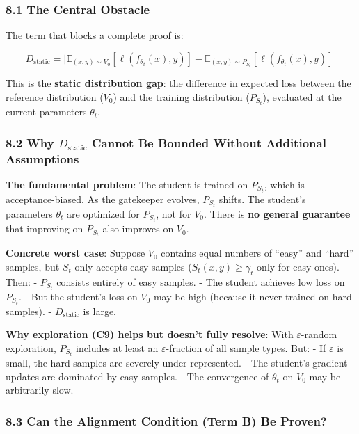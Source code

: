 \documentclass[
  12pt,
]{article}
\begin{document}
\subsubsection{8.1 The Central Obstacle}\label{the-central-obstacle}

The term that blocks a complete proof is:

\[\boxed{\;D_{\text{static}} = \bigl|\mathbb{E}_{(x,y) \sim V_0}[\ell(f_{\theta_t}(x), y)] - \mathbb{E}_{(x,y) \sim P_{S_t}}[\ell(f_{\theta_t}(x), y)]\bigr|\;}\]

This is the \textbf{static distribution gap}: the difference in expected
loss between the reference distribution (\(V_0\)) and the training
distribution (\(P_{S_t}\)), evaluated at the current parameters
\(\theta_t\).

\subsubsection{\texorpdfstring{8.2 Why \(D_{\text{static}}\) Cannot Be
Bounded Without Additional
Assumptions}{8.2 Why D\_\{\textbackslash text\{static\}\} Cannot Be Bounded Without Additional Assumptions}}\label{why-d_textstatic-cannot-be-bounded-without-additional-assumptions}

\textbf{The fundamental problem}: The student is trained on \(P_{S_t}\),
which is acceptance-biased. As the gatekeeper evolves, \(P_{S_t}\)
shifts. The student's parameters \(\theta_t\) are optimized for
\(P_{S_t}\), not for \(V_0\). There is \textbf{no general guarantee}
that improving on \(P_{S_t}\) also improves on \(V_0\).

\textbf{Concrete worst case}: Suppose \(V_0\) contains equal numbers of
``easy'' and ``hard'' samples, but \(S_t\) only accepts easy samples
(\(S_t(x,y) \geq \gamma_t\) only for easy ones). Then: - \(P_{S_t}\)
consists entirely of easy samples. - The student achieves low loss on
\(P_{S_t}\). - But the student's loss on \(V_0\) may be high (because it
never trained on hard samples). - \(D_{\text{static}}\) is large.

\textbf{Why exploration (C9) helps but doesn't fully resolve}: With
\(\varepsilon\)-random exploration, \(P_{S_t}\) includes at least an
\(\varepsilon\)-fraction of all sample types. But: - If \(\varepsilon\)
is small, the hard samples are severely under-represented. - The
student's gradient updates are dominated by easy samples. - The
convergence of \(\theta_t\) on \(V_0\) may be arbitrarily slow.

\subsubsection{8.3 Can the Alignment Condition (Term B) Be
Proven?}\label{can-the-alignment-condition-term-b-be-proven}
\end{document}
